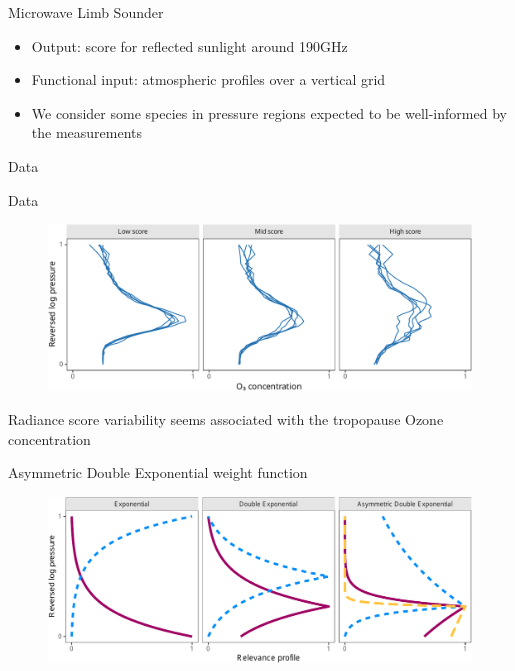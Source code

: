 \documentclass[final]{beamer}
\begin{document}
\begin{frame}[t]
{\begin{minipage}[t][76cm][t]{58cm}
{\begin{minipage}[t][20cm][t]{28cm}
\begin{block}{Microwave Limb Sounder}
\begin{itemize}
              experiments~\cite{turmon2019,braverman2021} rely on a myriad of runs
            \item Output: score for reflected sunlight around 190GHz~\cite{johnson2020}
            \item Functional input: atmospheric profiles over a vertical grid
            \item We consider some species in pressure regions expected to be
              well-informed by the measurements~\cite{liversey2020}
            \end{itemize}
          \end{block}
        \end{minipage}
      }
      \vskip1cm
      \colorbox{yellow!33}{
        \begin{minipage}[t][50cm][t]{58cm}
          Data
          \begin{block}{Data}
            \begin{figure}
              \centering
              \includegraphics[width=.85\linewidth]{inc/mls_input_profiles}
            \end{figure}

            \begin{center}
              Radiance score variability seems associated with the tropopause Ozone
              concentration
            \end{center}
          \end{block}

          \begin{block}{Asymmetric Double Exponential weight function}
            \begin{figure}
              \centering
              \includegraphics[width=.85\linewidth]{inc/mls_weight_profiles}
            \end{figure}


\end{block}
\end{minipage}}
\end{minipage}}
\end{frame}
\end{document}
